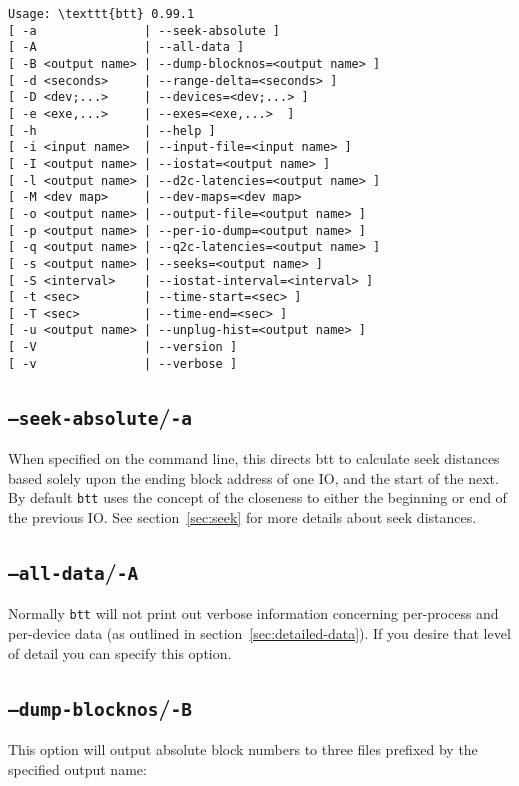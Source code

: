 \documentclass{article}
\begin{document}
\begin{verbatim}
Usage: \texttt{btt} 0.99.1 
[ -a               | --seek-absolute ]
[ -A               | --all-data ]
[ -B <output name> | --dump-blocknos=<output name> ]
[ -d <seconds>     | --range-delta=<seconds> ]
[ -D <dev;...>     | --devices=<dev;...> ]
[ -e <exe,...>     | --exes=<exe,...>  ]
[ -h               | --help ]
[ -i <input name>  | --input-file=<input name> ]
[ -I <output name> | --iostat=<output name> ]
[ -l <output name> | --d2c-latencies=<output name> ]
[ -M <dev map>     | --dev-maps=<dev map>
[ -o <output name> | --output-file=<output name> ]
[ -p <output name> | --per-io-dump=<output name> ]
[ -q <output name> | --q2c-latencies=<output name> ]
[ -s <output name> | --seeks=<output name> ]
[ -S <interval>    | --iostat-interval=<interval> ]
[ -t <sec>         | --time-start=<sec> ]
[ -T <sec>         | --time-end=<sec> ]
[ -u <output name> | --unplug-hist=<output name> ] 
[ -V               | --version ]
[ -v               | --verbose ]
\end{verbatim}

\subsection{\label{sec:o-a}\texttt{--seek-absolute}/\texttt{-a}}

  When specified on the command line, this directs btt to calculate
  seek distances based solely upon the ending block address of one IO,
  and the start of the next.  By default \texttt{btt} uses the concept
  of the closeness to either the beginning or end of the previous IO. See
  section~\ref{sec:seek} for more details about seek distances.

\subsection{\label{sec:o-A}\texttt{--all-data}/\texttt{-A}}

  Normally \texttt{btt} will not print out verbose information
  concerning per-process and per-device data (as outlined in
  section~\ref{sec:detailed-data}). If you desire that level of 
  detail you can specify this option.

\subsection{\label{sec:o-B}\texttt{--dump-blocknos}/\texttt{-B}}

  This option will output absolute block numbers to three files prefixed
  by the specified output name:
\end{document}
